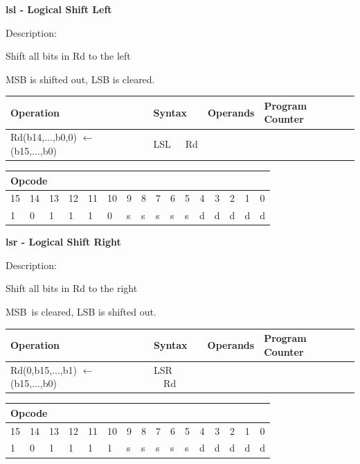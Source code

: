 \documentclass[%
	pdftex,
	a4paper,
	oneside,
	bibtotoc,%
	idxtotoc,%
	bibtotocnumbered,
	halfparskip,%
]{scrbook}
\begin{document}
\bigskip

\textbf{lsl - Logical Shift Left}

Description:

Shift all bits in Rd to the left

MSB is shifted out, LSB is cleared.

\begin{tabular}{|l|l|l|l|}
\hline
Operation & Syntax & Operands & Program Counter \\ \hline
Rd(b14,...,b0,0) $\leftarrow $ (b15,...,b0) & LSL\ \ \ Rd &  &  \\ \hline
\end{tabular}

\begin{tabular}{|c|c|c|c|c|c|c|c|c|c|c|c|c|c|c|c|}
\hline
\multicolumn{6}{|l|}{Opcode} & \multicolumn{5}{|l|}{} & \multicolumn{5}{|l|}{
} \\ \hline
15 & 14 & 13 & 12 & 11 & 10 & 9 & 8 & 7 & 6 & 5 & 4 & 3 & 2 & 1 & 0 \\ \hline
\multicolumn{1}{|l|}{1} & \multicolumn{1}{|l|}{0} & \multicolumn{1}{|l|}{1}
& \multicolumn{1}{|l|}{1} & \multicolumn{1}{|l|}{1} & \multicolumn{1}{|l|}{0}
& \multicolumn{1}{|l|}{s} & \multicolumn{1}{|l|}{s} & \multicolumn{1}{|l|}{s}
& \multicolumn{1}{|l|}{s} & \multicolumn{1}{|l|}{s} & \multicolumn{1}{|l|}{d}
& \multicolumn{1}{|l|}{d} & \multicolumn{1}{|l|}{d} & \multicolumn{1}{|l|}{d}
& \multicolumn{1}{|l|}{d} \\ \hline
\end{tabular}

\bigskip

\textbf{lsr - Logical Shift Right}

Description:

Shift all bits in Rd to the right

MSB\ is cleared, LSB is shifted out.

\begin{tabular}{|l|l|l|l|}
\hline
Operation & Syntax & Operands & Program Counter \\ \hline
Rd(0,b15,...,b1) $\leftarrow $ (b15,...,b0) & LSR \ \ Rd &  &  \\ \hline
\end{tabular}

\begin{tabular}{|c|c|c|c|c|c|c|c|c|c|c|c|c|c|c|c|}
\hline
\multicolumn{6}{|l|}{Opcode} & \multicolumn{5}{|l|}{} & \multicolumn{5}{|l|}{
} \\ \hline
15 & 14 & 13 & 12 & 11 & 10 & 9 & 8 & 7 & 6 & 5 & 4 & 3 & 2 & 1 & 0 \\ \hline
\multicolumn{1}{|l|}{1} & \multicolumn{1}{|l|}{0} & \multicolumn{1}{|l|}{1}
& \multicolumn{1}{|l|}{1} & \multicolumn{1}{|l|}{1} & \multicolumn{1}{|l|}{1}
& \multicolumn{1}{|l|}{s} & \multicolumn{1}{|l|}{s} & \multicolumn{1}{|l|}{s}
& \multicolumn{1}{|l|}{s} & \multicolumn{1}{|l|}{s} & \multicolumn{1}{|l|}{d}
& \multicolumn{1}{|l|}{d} & \multicolumn{1}{|l|}{d} & \multicolumn{1}{|l|}{d}
& \multicolumn{1}{|l|}{d} \\ \hline
\end{tabular}
\end{document}
